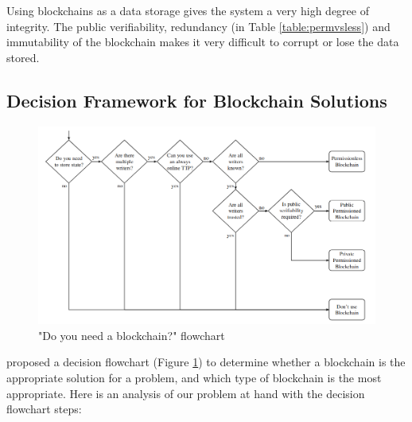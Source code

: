 Using blockchains as a data storage gives the system a very high degree of integrity. The public verifiability,
redundancy (in Table \ref{table:permvsless}) and immutability of the blockchain makes it very difficult to
corrupt or lose the data stored.

\subsection{Decision Framework for Blockchain Solutions}

\begin{figure}[!ht]
	\centering
	\includegraphics[width=1.0\textwidth]{blockchain_need}
	\caption["Do you need a blockchain?" flowchart]
	{"Do you need a blockchain?" flowchart \citep[p.3]{wust2017you}}
	\label{fig:blockchain_need}
\end{figure}

\citet[p.3]{wust2017you} proposed a decision flowchart (Figure \ref{fig:blockchain_need}) to determine whether a blockchain is
the appropriate solution for a problem, and which type of blockchain is the most appropriate. Here is an analysis of our problem at
hand with the decision flowchart steps:

